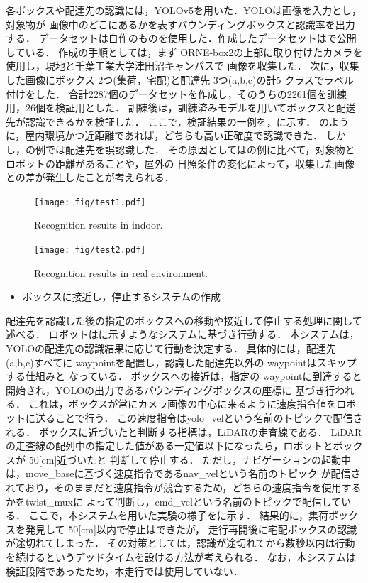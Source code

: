 \documentclass[twocolumn, 9pt]{jsproceedings}
\begin{document}
各ボックスや配達先の認識には，YOLOv5\cite{yolo}を用いた．YOLOは画像を入力とし，対象物が
画像中のどこにあるかを表すバウンディングボックスと認識率を出力する．
データセットは自作のものを使用した．作成したデータセットは\cite{nagashima}で公開している．
作成の手順としては，まず ORNE-box2の上部に取り付けたカメラを使用し，現地と千葉工業大学津田沼キャンパスで
画像を収集した．
次に，収集した画像にボックス 2つ(集荷，宅配)と配達先 3つ(a,b,c)の計5 クラスでラベル付けをした．
合計2287個のデータセットを作成し，そのうちの2261個を訓練用，26個を検証用とした．
訓練後は，訓練済みモデルを用いてボックスと配送先が認識できるかを検証した．
ここで，検証結果の一例を，に示す．
のように，屋内環境かつ近距離であれば，どちらも高い正確度で認識できた．
しかし，の例では配達先を誤認識した．
その原因としてはの例に比べて，対象物とロボットの距離があることや，屋外の
日照条件の変化によって，収集した画像との差が発生したことが考えられる．

\begin{figure}[h!]
  \centering
  \texttt{[image: fig/test1.pdf]}
  \caption{Recognition results in indoor.}
  \label{fig:test1}
\end{figure}

\begin{figure}[h!]
  \centering
  \texttt{[image: fig/test2.pdf]}
  \caption{Recognition results in real environment.}
  \label{fig:test2}
\end{figure}

\begin{itemize}
  \setlength{\leftskip}{-1zw}
  \item ボックスに接近し，停止するシステムの作成
\end{itemize}
\vspace*{-2.5mm}

配達先を認識した後の指定のボックスへの移動や接近して停止する処理に関して述べる．
ロボットはに示すようなシステムに基づき行動する．
本システムは，YOLOの配達先の認識結果に応じて行動を決定する．
具体的には，配達先(a,b,c)すべてに waypointを配置し，認識した配達先以外の waypointはスキップする仕組みと
なっている．
ボックスへの接近は，指定の waypointに到達すると開始され，YOLOの出力であるバウンディングボックスの座標に
基づき行われる．
これは，ボックスが常にカメラ画像の中心に来るように速度指令値をロボットに送ることで行う．
この速度指令はyolo\_velという名前のトピックで配信される．
ボックスに近づいたと判断する指標は，LiDARの走査線である．
LiDARの走査線の配列中の指定した値がある一定値以下になったら，ロボットとボックスが 50[cm]近づいたと
判断して停止する．
ただし，ナビゲーションの起動中は，move\_baseに基づく速度指令であるnav\_velという名前のトピック
が配信されており，そのままだと速度指令が競合するため，どちらの速度指令を使用するかをtwist\_mux\cite{twist}に
よって判断し，cmd\_velという名前のトピックで配信している．
ここで，本システムを用いた実験の様子をに示す．
結果的に，集荷ボックスを発見して 50[cm]以内で停止はできたが，
走行再開後に宅配ボックスの認識が途切れてしまった．
その対策としては，認識が途切れてから数秒以内は行動を続けるというデッドタイムを設ける方法が考えられる．
なお，本システムは検証段階であったため，本走行では使用していない．
\end{document}

